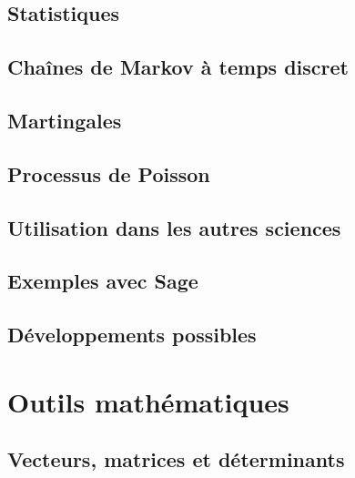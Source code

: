\chapter{Statistiques}


\chapter{Chaînes de Markov à temps discret}


\chapter{Martingales}


\chapter{Processus de Poisson}


\chapter{Utilisation dans les autres sciences}


\chapter{Exemples avec Sage}



\chapter{Développements possibles}



 
\part{Outils mathématiques} 

\chapter{Vecteurs, matrices et déterminants}
    

